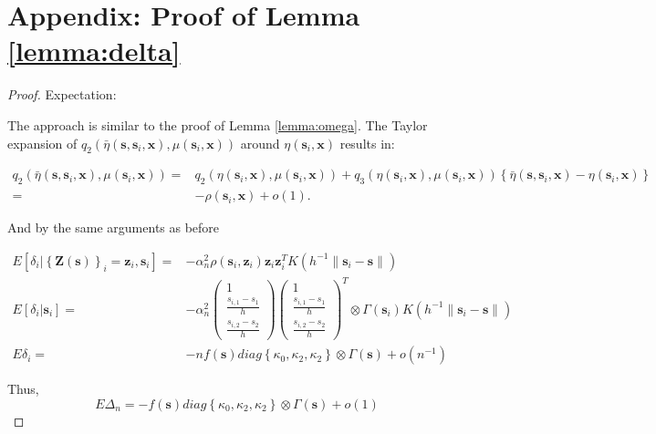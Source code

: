 \documentclass[english]{article}\usepackage[]{graphicx}\usepackage[]{color}
\theoremstyle{plain}
\theoremstyle{plain}
\begin{document}
\section*{Appendix: Proof of Lemma \ref{lemma:delta}}
\begin{proof}
Expectation:

The approach is similar to the proof of Lemma \ref{lemma:omega}.
The Taylor expansion of $q_{2}\left(\bar{\eta}\left(\bm{s},\bm{s}_{i},\bm{x}\right),\mu\left(\bm{s}_{i},\bm{x}\right)\right)$
around $\eta\left(\bm{s}_{i},\bm{x}\right)$ results in:

\begin{align*}
q_{2}\left(\bar{\eta}\left(\bm{s},\bm{s}_{i},\bm{x}\right),\mu\left(\bm{s}_{i},\bm{x}\right)\right)= & q_{2}\left(\eta\left(\bm{s}_{i},\bm{x}\right),\mu\left(\bm{s}_{i},\bm{x}\right)\right)+q_{3}\left(\eta\left(\bm{s}_{i},\bm{x}\right),\mu\left(\bm{s}_{i},\bm{x}\right)\right)\left\{ \bar{\eta}\left(\bm{s},\bm{s}_{i},\bm{x}\right)-\eta\left(\bm{s}_{i},\bm{x}\right)\right\} \\
= & -\rho\left(\bm{s}_{i},\bm{x}\right)+o\left(1\right).
\end{align*}


And by the same arguments as before

\begin{align*}
E\left[\delta_{i}|\left\{ \bm{Z}\left(\bm{s}\right)\right\} _{i}=\bm{z}_{i},\bm{s}_{i}\right]= & -\alpha_{n}^{2}\rho\left(\bm{s}_{i},\bm{z}_{i}\right)\bm{z}_{i}\bm{z}_{i}^{T}K\left(h^{-1}\|\bm{s}_{i}-\bm{s}\|\right)\\
E\left[\delta_{i}|\bm{s}_{i}\right]= & -\alpha_{n}^{2}\left(\begin{array}{c}
1\\
\frac{s_{i,1}-s_{1}}{h}\\
\frac{s_{i,2}-s_{2}}{h}
\end{array}\right)\left(\begin{array}{c}
1\\
\frac{s_{i,1}-s_{1}}{h}\\
\frac{s_{i,2}-s_{2}}{h}
\end{array}\right)^{T}\otimes\Gamma\left(\bm{s}_{i}\right)K\left(h^{-1}\|\bm{s}_{i}-\bm{s}\|\right)\\
E\delta_{i}= & -nf\left(\bm{s}\right)diag\left\{ \kappa_{0},\kappa_{2},\kappa_{2}\right\} \otimes\Gamma\left(\bm{s}\right)+o\left(n^{-1}\right)
\end{align*}


Thus, 
\[
E\Delta_{n}=-f\left(\bm{s}\right)diag\left\{ \kappa_{0},\kappa_{2},\kappa_{2}\right\} \otimes\Gamma\left(\bm{s}\right)+o\left(1\right)
\]



\end{proof}
\end{document}

